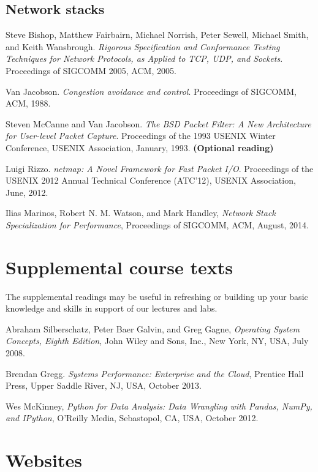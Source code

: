 \documentclass[a4paper,10pt]{article}
\begin{document}
\subsection*{Network stacks}

Steve Bishop, Matthew Fairbairn, Michael Norrish, Peter Sewell, Michael Smith,
and Keith Wansbrough.  \textit{Rigorous Specification and Conformance Testing
Techniques for Network Protocols, as Applied to TCP, UDP, and Sockets}.
Proceedings of SIGCOMM 2005, ACM, 2005.

\medskip
\noindent
Van Jacobson.  \textit{Congestion avoidance and control}.  Proceedings of
SIGCOMM, ACM, 1988.

\medskip
\noindent
Steven McCanne and Van Jacobson.  \textit{The BSD Packet Filter: A New
Architecture for User-level Packet Capture}.  Proceedings of the 1993 USENIX
Winter Conference, USENIX Association, January, 1993.  \textbf{(Optional
reading)}

\medskip
\noindent
Luigi Rizzo.  \textit{netmap: A Novel Framework for Fast Packet I/O}.
Proceedings of the USENIX 2012 Annual Technical Conference (ATC'12), USENIX
Association, June, 2012.

\medskip
\noindent
Ilias Marinos, Robert N. M. Watson, and Mark Handley, \textit{Network Stack
Specialization for Performance}, Proceedings of SIGCOMM, ACM, August, 2014.

\section*{Supplemental course texts}

The supplemental readings may be useful in refreshing or building up your
basic knowledge and skills in support of our lectures and labs.

\medskip

\noindent
Abraham Silberschatz, Peter Baer Galvin, and Greg Gagne, \textit{Operating
System Concepts, Eighth Edition}, John Wiley and Sons, Inc., New York, NY, USA,
July 2008.

\medskip
\noindent
Brendan Gregg. \textit{Systems Performance: Enterprise and the Cloud},
Prentice Hall Press, Upper Saddle River, NJ, USA, October 2013.

\medskip
\noindent
Wes McKinney, \textit{Python for Data Analysis: Data Wrangling with Pandas,
NumPy, and IPython}, O'Reilly Media, Sebastopol, CA, USA, October 2012.

\section*{Websites}
\end{document}
